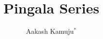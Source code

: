 \documentclass[journal,12pt,twocolumn]{IEEEtran}
\begin{document}
	\let\StandardTheFigure\thefigure
	\renewcommand{\thefigure}{\theproblem}
	
	
	
	\def\putbox#1#2#3{\makebox[0in][l]{\makebox[#1][l]{}\raisebox{\baselineskip}[0in][0in]{\raisebox{#2}[0in][0in]{#3}}}}
	\def\rightbox#1{\makebox[0in][r]{#1}}
	\def\centbox#1{\makebox[0in]{#1}}
	\def\topbox#1{\raisebox{-\baselineskip}[0in][0in]{#1}}
	\def\midbox#1{\raisebox{-0.5\baselineskip}[0in][0in]{#1}}
	
	\vspace{3cm}
	
	\title{ 
		Pingala Series
	}
	
	
	
	\author{ Aakash Kamuju$^{*}$ %
	}%
% 
%
\end{document}
